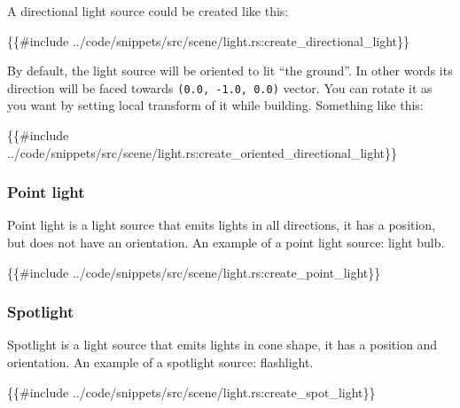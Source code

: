 \documentclass[
]{book}
\newenvironment{Shaded}{\begin{snugshade}}{\end{snugshade}}
\newcommand{\NormalTok}[1]{#1}
\theoremstyle{definition}
\theoremstyle{definition}
\theoremstyle{definition}
\theoremstyle{definition}
\theoremstyle{remark}
\begin{document}
A directional light source could be created like this:

\begin{Shaded}
\begin{Highlighting}[]
\NormalTok{\{\{\#include ../code/snippets/src/scene/light.rs:create\_directional\_light\}\}}
\end{Highlighting}
\end{Shaded}

By default, the light source will be oriented to lit ``the ground''. In other words its direction will be faced towards \texttt{(0.0,\ -1.0,\ 0.0)} vector. You can rotate it as you want by setting local transform of it while building. Something like this:

\begin{Shaded}
\begin{Highlighting}[]
\NormalTok{\{\{\#include ../code/snippets/src/scene/light.rs:create\_oriented\_directional\_light\}\}}
\end{Highlighting}
\end{Shaded}

\subsubsection{Point light}\label{point-light}

Point light is a light source that emits lights in all directions, it has a position, but does not have an orientation. An example of a point light source: light bulb.

\begin{Shaded}
\begin{Highlighting}[]
\NormalTok{\{\{\#include ../code/snippets/src/scene/light.rs:create\_point\_light\}\}}
\end{Highlighting}
\end{Shaded}

\subsubsection{Spotlight}\label{spotlight}

Spotlight is a light source that emits lights in cone shape, it has a position and orientation. An example of a spotlight source: flashlight.

\begin{Shaded}
\begin{Highlighting}[]
\NormalTok{\{\{\#include ../code/snippets/src/scene/light.rs:create\_spot\_light\}\}}
\end{Highlighting}
\end{Shaded}
\end{document}
